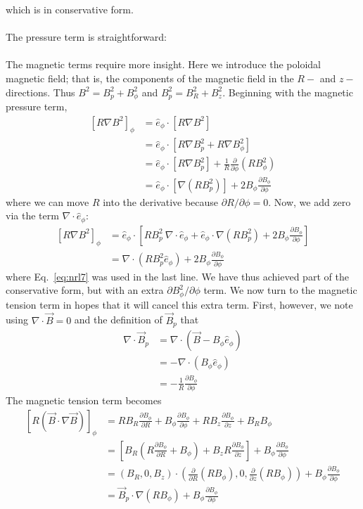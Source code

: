 which is in conservative form. \\
\\
The pressure term is straightforward:\\
\\
The magnetic terms require more insight. Here we introduce the poloidal magnetic field; that is, the components of the magnetic field in the $R-$ and $z-$directions. Thus $B^2=B_p^2+B_\phi^2$ and $B_p^2=B_R^2+B_z^2$. Beginning with the magnetic pressure term,
\begin{align*}
  \left[R\nabla B^2\right]_\phi&=\hat e_\phi\cdot\left[R\nabla B^2\right]\\
  &=\hat e_\phi\cdot\left[R\nabla B^2_p+R\nabla B^2_\phi\right]\\
  &=\hat e_\phi\cdot\left[R\nabla B^2_p\right]+\frac1R\frac{\partial}{\partial\phi}\left(RB_\phi^2\right)\\
  &=\hat e_\phi\cdot\left[\nabla \left(RB^2_p\right)\right]+2B_\phi\frac{\partial B_\phi}{\partial\phi}
\end{align*}
where we can move $R$ into the derivative because $\partial R/\partial\phi=0$. Now, we add zero via the term $\nabla\cdot\hat e_\phi$:
\begin{align}
  \left[R\nabla B^2\right]_\phi&=\hat e_\phi\cdot\left[RB_p^2~\nabla\cdot\hat e_\phi+\hat e_\phi\cdot\nabla\left(RB_p^2\right)+2B_\phi\frac{\partial B_\phi}{\partial\phi}\right]\nonumber\\
  &=\nabla\cdot\left(RB_p^2\hat e_\phi\right)+2B_\phi\frac{\partial B_\phi}{\partial\phi}\label{eq:magPress}
\end{align}
where Eq.~\ref{eq:nrl7} was used in the last line. We have thus achieved part of the conservative form, but with an extra $\partial B_\phi^2/\partial\phi$ term. We now turn to the magnetic tension term in hopes that it will cancel this extra term. First, however, we note using $\nabla\cdot\vec B=0$ and the definition of $\vec B_p$ that
\begin{align}
  \nabla\cdot\vec B_p &=\nabla\cdot\left(\vec B-B_\phi\hat e_\phi\right)\nonumber\\
  &=-\nabla\cdot\left(B_\phi\hat e_\phi\right)\nonumber\\
  &=-\frac1R\frac{\partial B_\phi}{\partial\phi}\label{eq:divBp}
\end{align}
The magnetic tension term becomes
\begin{align}
  \left[R\left(\vec B\cdot\nabla\vec B\right)\right]_\phi&=RB_R\frac{\partial B_\phi}{\partial R}+B_\phi\frac{\partial B_\phi}{\partial\phi}+RB_z\frac{\partial B_\phi}{\partial z}+B_RB_\phi\nonumber\\
  &=\left[B_R\left(R\frac{\partial B_\phi}{\partial R}+B_\phi\right)+B_zR\frac{\partial B_\phi}{\partial z}\right]+B_\phi\frac{\partial B_\phi}{\partial\phi}\nonumber\\
  &=(B_R,0,B_z)\cdot\left(\frac\partial{\partial R}(RB_\phi),0,\frac\partial{\partial z}(RB_\phi)\right)+B_\phi\frac{\partial B_\phi}{\partial\phi}\nonumber\\
  &=\vec B_p\cdot\nabla\left(RB_\phi\right)+B_\phi\frac{\partial B_\phi}{\partial\phi}
\end{align}

